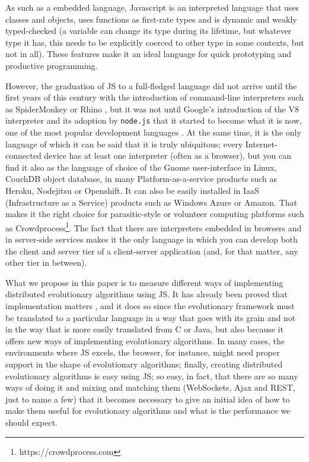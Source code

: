 \documentclass{sig-alternate}
\begin{document}
As such as a embedded language, Javascript is an interpreted language
that uses classes and objects, uses functions as first-rate types and
is dynamic and weakly typed-checked (a variable can change its type during
its lifetime, but whatever type it has, this needs to be explicitly coerced
to other type in some contexts, but not in all). These features make
it an ideal language for quick prototyping and productive
programming. 

However, the graduation of JS to a full-fledged language did not arrive until the first years of
this century with the introduction of command-line interpreters such
as SpiderMonkey or Rhino \cite{mikkonen2007using}, but it was not
until Google's introduction of the V8 \cite{richards2010analysis}
interpreter and its adoption by  {\tt node.js} that it started to
become what it is now, one of the most popular development languages
\cite{ogrady14:ranking}. At the same time, it is the only language of
which it can be said that it is truly ubiquitous; every
Internet-connected device has at least one interpreter
\cite{crockford:javascript} (often as a browser), but you can find it
also as the language of choice of the Gnome user-interface in Linux,
CouchDB object database, in many Platform-as-a-service products such
as Heroku, Nodejitsu or Openshift. It can also be easily installed in
IaaS (Infrastructure as a Service) products such as Windows Azure or Amazon. That makes it the right
choice for parasitic-style or volunteer computing platforms such as
Crowdprocess\footnote{https://crowdprocess.com}. The fact that there are interpreters embedded in browsers
and in server-side services makes it the only language in which you can
develop both the client and server tier of a client-server application
(and, for that matter, any other tier in between).

What we propose in this paper is to measure different ways of
implementing distributed evolutionary algorithms using JS. It
has already been proved that implementation matters
\cite{DBLP:conf/iwann/MereloRACML11}, and it does so since the
evolutionary framework must be translated to a particular language in
a way that goes with its grain and not in the way that is more easily
translated from C or Java, but also because it offers new ways of
implementing evolutionary algorithms. 
In many cases, the environments
where JS excels, the browser, for instance, might need proper
support in the shape of evolutionary algorithms; finally, creating
distributed evolutionary algorithms is easy using JS; so easy,
in fact, that there are so many ways of doing it and mixing and
matching them (WebSockets, Ajax and REST, just to name a few) that it
becomes necessary to give an initial idea of how to make them useful
for evolutionary algorithms and what is the performance we should
expect. 
\end{document}
